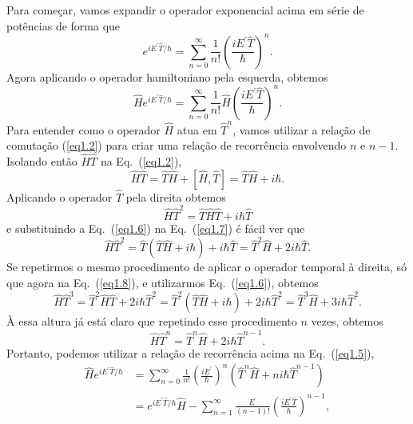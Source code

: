 Para começar, vamos expandir o operador exponencial acima em série de potências de forma que
\begin{equation}\label{eq1.4}
    e^{iE^\prime \hat{T}/\hbar} = \sum_{n=0}^{\infty} \frac{1}{n!} \left( \frac{iE^\prime \hat{T}}{\hbar} \right)^n .
\end{equation}
Agora aplicando o operador hamiltoniano pela esquerda, obtemos
\begin{equation}\label{eq1.5}
    \hat{H} e^{iE^\prime \hat{T}/\hbar} = \sum_{n=0}^{\infty} \frac{1}{n!} \hat{H} \left( \frac{iE^\prime \hat{T}}{\hbar} \right)^n .
\end{equation}
Para entender como o operador $\hat{H}$ atua em $\hat{T}^n$, vamos utilizar a relação de comutação (\ref{eq1.2}) para criar uma relação de recorrência envolvendo $n$ e $n-1$. Isolando então $\hat{H}\hat{T}$ na Eq.~(\ref{eq1.2}), 
\begin{equation}\label{eq1.6}
   \hat{H}\hat{T} = \hat{T}\hat{H} + [\hat{H},\hat{T}] = \hat{T}\hat{H} + i\hbar.
\end{equation}
Aplicando o operador $\hat{T}$ pela direita obtemos
\begin{equation}\label{eq1.7}
   \hat{H}\hat{T}^2 = \hat{T}\hat{H}\hat{T} + i\hbar \hat{T}
\end{equation}
e substituindo a Eq.~(\ref{eq1.6}) na Eq.~(\ref{eq1.7}) é fácil ver que 
\begin{equation}\label{eq1.8}
   \hat{H}\hat{T}^2 = \hat{T} \left( \hat{T}\hat{H} + i\hbar \right) + i \hbar \hat{T} = \hat{T}^2\hat{H} + 2i\hbar \hat{T}.
\end{equation}
Se repetirmos o mesmo procedimento de aplicar o operador temporal à direita, só que agora na Eq.~(\ref{eq1.8}), e utilizarmos Eq.~(\ref{eq1.6}), obtemos 
\begin{equation}\label{eq1.9}
     \hat{H}\hat{T}^3  = \hat{T}^2 \hat{H}\hat{T} + 2 i\hbar \hat{T}^2 = \hat{T}^2 \left( \hat{T}\hat{H} + i\hbar \right) + 2i\hbar \hat{T}^2 = \hat{T}^3\hat{H} + 3 i\hbar \hat{T}^2.
\end{equation}
À essa altura já está claro que repetindo esse procedimento $n$ vezes, obtemos
\begin{equation}\label{eq1.10}
     \hat{H}\hat{T}^n = \hat{T}^{n} \hat{H} + 2i\hbar \hat{T}^{n-1}.
\end{equation}
Portanto, podemos utilizar a relação de recorrência acima na Eq.~(\ref{eq1.5}),
\begin{equation}\label{eq1.11}
\begin{split}
    \hat{H} e^{iE^\prime \hat{T}/\hbar} & = \sum_{n=0}^{\infty} \frac{1}{n!} \left( \frac{iE^\prime}{\hbar} \right)^n \left(\hat{T}^n\hat{H} + n i\hbar \hat{T}^{n-1} \right) \\
    & = e^{iE^\prime \hat{T}/\hbar}\hat{H} - \sum_{n=1}^{\infty} \frac{E^\prime}{(n-1)!}  \left( \frac{iE^\prime \hat{T}}{\hbar} \right)^{n-1},
\end{split}
\end{equation}
